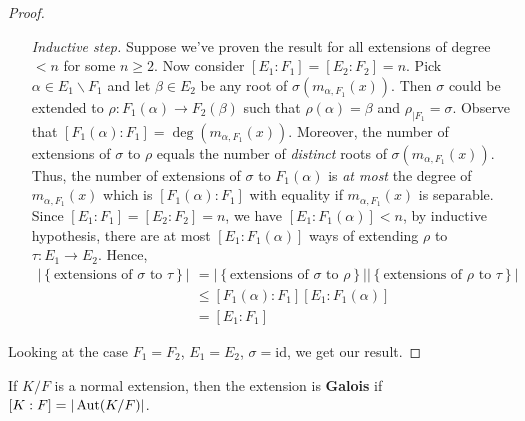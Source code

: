 \documentclass[12pt]{article}
\begin{document}
\begin{proof}
\begin{enumerate}[align=left]
        \item[\textit{Inductive step. }] Suppose we've proven the result for all extensions of degree $<n$ for some $n\geq 2$. Now consider $[E_1:F_1]=[E_2:F_2]=n$. Pick $\alpha\in E_1\backslash F_1$ and let $\beta\in E_2$ be any root of $\sigma(m_{\alpha,F_1}(x))$. Then $\sigma$ could be extended to $\rho:F_1(\alpha)\to F_2(\beta)$ such that $\rho(\alpha)=\beta$ and $\rho_{|F_1}=\sigma$. Observe that $[F_1(\alpha):F_1]=\deg(m_{\alpha,F_1}(x))$. Moreover, the number of extensions of $\sigma$ to $\rho$ equals the number of\textit{ distinct} roots of $\sigma(m_{\alpha,F_1}(x))$. Thus, the number of extensions of $\sigma$ to $F_1(\alpha)$ is \textit{at most} the degree of $m_{\alpha,F_1}(x)$ which is $[F_1(\alpha):F_1]$ with equality if $m_{\alpha,F_1}(x)$ is separable. Since $[E_1:F_1]=[E_2:F_2]=n$, we have $[E_1:F_1(\alpha)]<n$, by inductive hypothesis, there are at most $[E_1:F_1(\alpha)]$ ways of extending $\rho$ to $\tau:E_1\to E_2$. Hence, \begin{align*}
            |\left\{ \text{extensions of }\sigma \text{ to } \tau\right\}| &= |\left\{ \text{extensions of }\sigma \text{ to } \rho\right\}||\left\{ \text{extensions of }\rho \text{ to } \tau\right\}|\\
&\leq [F_1(\alpha):F_1][E_1:F_1(\alpha)]\\
&=[E_1:F_1]
        \end{align*}
    \end{enumerate}
    Looking at the case $F_1=F_2$, $E_1=E_2$, $\sigma=\mathrm{id}$, we get our result.
\end{proof}

 If $K/F$ is a normal extension, then the extension is \textbf{Galois} if $[K:F]=|\operatorname{Aut}(K/F)|$.
\end{document}
